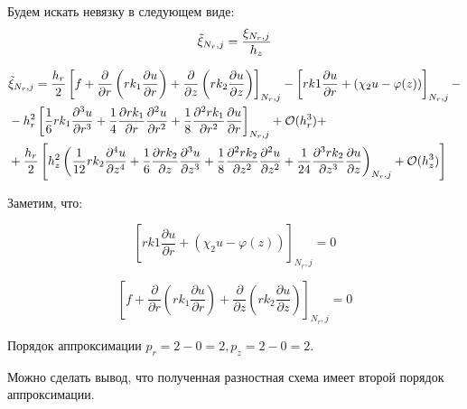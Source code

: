 Будем искать невязку в следующем виде:
\[
  \Tilde{\xi}_{N_r, j} = \frac{\xi_{N_r, j}}{h_z}
\]

\begin{align*}
  &\Tilde{\xi}_{N_r, j} = \frac{h_r}{2} \left[
    f + \frac{\partial}{\partial r}\left( rk_1 \frac{\partial u}{\partial r}\right)
    + \frac{\partial}{\partial z}\left( rk_2 \frac{\partial u}{\partial z}\right)
  \right]_{N_r, j}
  - \left[
    rk1\frac{\partial u}{\partial r} + (\chi_2 u - \varphi(z))
  \right]_{N_r, j} -\\
  & -h^2_r \left[
    \frac{1}{6} rk_1 \frac{\partial^3 u}{\partial r^3} +
    \frac{1}{4} \frac{\partial rk_1}{\partial r} \frac{\partial^2 u}{\partial r^2} +
    \frac{1}{8} \frac{\partial^2 rk_1}{\partial r^2} \frac{\partial u}{\partial r}
  \right]_{N_r, j} + \mathcal{O}(h^3_r) +\\
  &+\frac{h_r}{2} \left[
    h^2_z \left( 
      \frac{1}{12} rk_2 \frac{\partial^4 u}{\partial z^4} +
      \frac{1}{6} \frac{\partial rk_2}{\partial z} \frac{\partial^3 u}{\partial z^3} +
      \frac{1}{8} \frac{\partial^2 rk_2}{\partial z^2} \frac{\partial^2 u}{\partial z^2} +
      \frac{1}{24} \frac{\partial^3 rk_2}{\partial z^3} \frac{\partial u}{\partial z}
    \right)_{N_r, j}
    +  \mathcal{O}(h^3_z)
  \right]
\end{align*}

Заметим, что:

\[
  \left[
    rk1\frac{\partial u}{\partial r} + (\chi_2 u - \varphi(z))
  \right]_{N_r, j} = 0
\]

\[
  \left[f + \frac{\partial}{\partial r}\left( rk_1 \frac{\partial u}{\partial r}\right)
    + \frac{\partial}{\partial z}\left( rk_2 \frac{\partial u}{\partial z}\right) \right]_{N_r, j} = 0
\]

Порядок аппроксимации $ p_r = 2 - 0 = 2, p_z = 2 - 0 = 2 $.

Можно сделать вывод, что полученная разностная схема имеет второй порядок аппроксимации.
